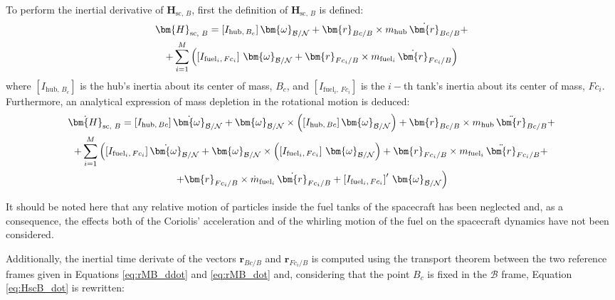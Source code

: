 To perform the inertial derivative of $\bm{H}_{\text{sc, }B}$, first the definition of $\bm{H}_{\text{sc, }B}$ is defined:
\begin{multline}
	\bm{H}_{\text{sc, }B}= \left[I_{\text{hub},\,B_c}\right] \bm{\omega}_{\cal{B}/\cal{N}} + \bm{r}_{Bc/B} \times m_\text{hub} \,\dot{\bm{r}}_{Bc/B} +\\ +\sum_{i=1}^{M}\left(\left[I_{\text{fuel}_i,\,Fc_i}\right]\, \bm{\omega}_{\cal{B}/\cal{N}} + \bm{r}_{Fc_i/B} \times m_{\text{fuel}_i}\, \dot{\bm{r}}_{Fc_i/B}\right)
\end{multline}
where $\left[I_{\text{hub},\,B_c}\right]$ is the hub's inertia about its center of mass, $B_c$, and $\left[I_{\text{fuel}_i,\,Fc_i}\right]$ is the $i-$th tank's inertia about its center of mass, $Fc_i$. Furthermore, an analytical expression of mass depletion in the rotational motion is deduced:
\begin{multline}\label{eq:HscB_dot}
	\dot{\bm{H}}_{\text{sc, }B} = \left[I_{\text{hub},\,Bc}\right]\dot{\bm{\omega}}_{\cal{B}/\cal{N}} + \bm{\omega}_{\cal{B}/\cal{N}} \times \left(\left[I_{\text{hub},\,Bc}\right]\bm{\omega}_{\cal{B}/\cal{N}}\right)+ \bm{r}_{Bc/B} \times m_\text{hub}\,\ddot{\bm{r}}_{Bc/B} +\\
	+ \sum_{i=1}^{M}\left(\left[I_{\text{fuel}_i,\,Fc_i}\right] \dot{\bm{\omega}}_{\cal{B}/\cal{N}} + \bm{\omega}_{\cal{B}/\cal{N}} \times \left(\left[I_{\text{fuel}_i,\,Fc_i}\right]\, \bm{\omega}_{\cal{B}/\cal{N}}\right)
	+ \bm{r}_{Fc_i/B} \times m_{\text{fuel}_i}\, \ddot{\bm{r}}_{Fc_i/B}+\right.\\
	\left.+ \bm{r}_{Fc_i/B} \times \dot{m}_{\text{fuel}_i} \,\dot{\bm{r}}_{Fc_i/B} + \left[I_{\text{fuel}_i,\, Fc_i}\right]' \, \bm{\omega}_{\cal{B}/\cal{N}}\right)
\end{multline}

It should be noted here that any relative motion of particles inside the fuel tanks of the spacecraft has been neglected and, as a consequence, the effects both of the Coriolis' acceleration and of the whirling motion of the fuel on the spacecraft dynamics have not been considered.

Additionally, the inertial time derivate of the vectors $\bm{r}_{Bc/B}$ and $\bm{r}_{Fc_i/B}$ is computed using the transport theorem between the two reference frames given in Equations \eqref{eq:rMB_ddot} and \eqref{eq:rMB_dot} and, considering that the point $B_c$ is fixed in the $\mathcal{B}$ frame, Equation \eqref{eq:HscB_dot} is rewritten:

